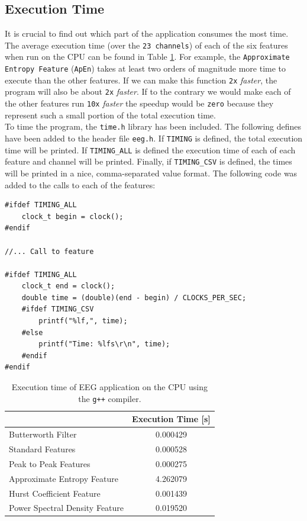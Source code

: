 \documentclass[a4paper]{article}
\begin{document}
\subsection{Execution Time} 
It is crucial to find out which part of the application consumes the most time. The average execution time (over the \texttt{23 channels}) of each of the six features when run on the CPU can be found in Table \ref{tab:CPU}. For example, the \texttt{Approximate Entropy Feature} (\texttt{ApEn}) takes at least two orders of magnitude more time to execute than the other features. If we can make this function \texttt{2x} \textit{faster}, the program will also be about \texttt{2x} \textit{faster}. If to the contrary we would make each of the other features run \texttt{10x} \textit{faster} the speedup would be \texttt{zero} because they represent such a small portion of the total execution time.
\\

\noindent To time the program, the \texttt{time.h} library has been included. The following defines have been added to the header file \texttt{eeg.h}. If \texttt{TIMING} is defined, the total execution time will be printed. If \texttt{TIMING\_ALL} is defined the execution time of each of each feature and channel will be printed. Finally, if \texttt{TIMING\_CSV} is defined, the times will be printed in a nice, comma-separated value format. The following code was added to the calls to each of the features:
\begin{lstlisting}
#ifdef TIMING_ALL
	clock_t begin = clock();
#endif

//... Call to feature

#ifdef TIMING_ALL
	clock_t end = clock();
	double time = (double)(end - begin) / CLOCKS_PER_SEC;
	#ifdef TIMING_CSV
		printf("%lf,", time);
	#else
		printf("Time: %lfs\r\n", time);
	#endif
#endif
\end{lstlisting}

\begin{table}[h!]
\begin{center}  
\begin{tabular}{| l | c |}
\hline
\rowcolor[HTML]{c0c0c0}
\multicolumn{1}{| c |}{Feature} & Execution Time [s]\\ \hline
Butterworth Filter & 0.000429\\ \hline
Standard Features & 0.000528\\ \hline
Peak to Peak Features & 0.000275\\ \hline
Approximate Entropy Feature & 4.262079\\ \hline
Hurst Coefficient Feature & 0.001439\\ \hline
Power Spectral Density Feature & 0.019520\\ \hline
\end{tabular}
\caption{Execution time of EEG application on the CPU using the \texttt{g++} compiler.}
\label{tab:CPU}
\end{center}
\end{table}
\end{document}
